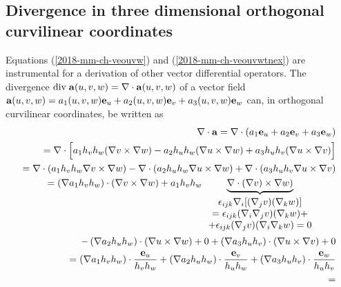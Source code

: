 \subsection{Divergence in three dimensional orthogonal curvilinear coordinates}

Equations
(\ref{2018-mm-ch-veouvw})
 and
(\ref{2018-mm-ch-veouvwtnex})
are instrumental for a derivation of other vector differential operators.
The divergence $\text{div}\;{\bf a}(u,v,w) = \nabla \cdot {\bf a}(u,v,w)$  of a vector field
${\bf a}(u,v,w) =
a_1(u,v,w) {\bf e}_u +
a_2(u,v,w) {\bf e}_v +
a_3(u,v,w) {\bf e}_w$ can,
in orthogonal curvilinear coordinates,
be written as
\begin{equation}
\begin{split}
\nabla \cdot {\bf a}
=
\nabla \cdot \left(
a_1  {\bf e}_u +
a_2  {\bf e}_v +
a_3  {\bf e}_w
\right)
\\ =
\nabla \cdot \Big[
a_1   h_v h_w ( \nabla  v \times \nabla  w ) -
a_2   h_u h_w ( \nabla  u \times \nabla  w ) +
a_3   h_u h_v ( \nabla  u \times \nabla  v )
\Big]
\\ =
\nabla \cdot \left(a_1   h_v h_w   \nabla  v \times \nabla  w \right) -
\nabla \cdot \left(a_2   h_u h_w   \nabla  u \times \nabla  w \right) +
\nabla \cdot \left(a_3   h_u h_v   \nabla  u \times \nabla  v \right)
\\ =
\left(\nabla a_1 h_v h_w\right) \cdot    \left(\nabla  v \times \nabla  w \right)  +
a_1 h_v h_w   \underbrace{\nabla \cdot  ( \nabla  v) \times \nabla  w ) }_{\begin{array}{c}
\epsilon_{ijk} \nabla_i [(\nabla_j v) (\nabla_k w)]\\=
\epsilon_{ijk} (\nabla_i \nabla_j v) (\nabla_k w)+\\+
\epsilon_{ijk} (\nabla_j v) (\nabla_i \nabla_k w)=0
\end{array}
}
\qquad
\\
- \left(\nabla a_2 h_u h_w\right) \cdot    \left(\nabla  u \times \nabla  w \right)  + 0
+ \left(\nabla a_3 h_u h_v\right) \cdot    \left(\nabla  u \times \nabla  v \right)  + 0
\\ =
  \left(\nabla a_1 h_v h_w\right) \cdot    \frac{ {\bf e}_u}{h_v h_w}
+ \left(\nabla a_2 h_u h_w\right) \cdot    \frac{ {\bf e}_v}{h_u h_w}
+ \left(\nabla a_3 h_u h_v\right) \cdot    \frac{ {\bf e}_w}{h_u h_v}
\\ =

\end{split}
\end{equation}
